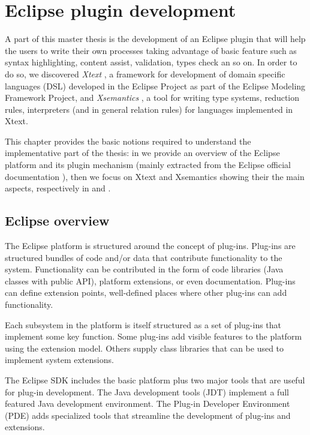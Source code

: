 
\chapter{Eclipse plugin development}\label{chap:eclipse-pde}

A part of this master thesis is the development of an Eclipse plugin that will help the \coco users to write their own processes taking advantage of basic feature such as syntax highlighting, content assist, validation, types check an so on. In order to do so, we discovered \emph{Xtext} \cite{xtext-site}, a framework for development of domain specific languages (DSL) developed in the Eclipse Project as part of the Eclipse Modeling Framework Project, and \emph{Xsemantics} \cite{xsemantics-site}, a tool for writing type systems, reduction rules, interpreters (and in general relation rules) for languages implemented in Xtext.

This chapter provides the basic notions required to understand the implementative part of the thesis: in  we provide an overview of the Eclipse platform and its plugin mechanism (mainly extracted from the Eclipse official documentation \cite{eclipse-official}), then we focus on Xtext and Xsemantics showing their the main aspects, respectively in  and . 

\section{Eclipse overview}\label{sec:eclipse-overview}
The Eclipse platform is structured around the concept of plug-ins. Plug-ins are structured bundles of code and/or data that contribute functionality to the system. Functionality can be contributed in the form of code libraries (Java classes with public API), platform extensions, or even documentation. Plug-ins can define extension points, well-defined places where other plug-ins can add functionality.

Each subsystem in the platform is itself structured as a set of plug-ins that implement some key function. Some plug-ins add visible features to the platform using the extension model. Others supply class libraries that can be used to implement system extensions.

The Eclipse SDK includes the basic platform plus two major tools that are useful for plug-in development.  The Java development tools (JDT) implement a full featured Java development environment.  The Plug-in Developer Environment (PDE) adds specialized tools that streamline the development of plug-ins and extensions.

